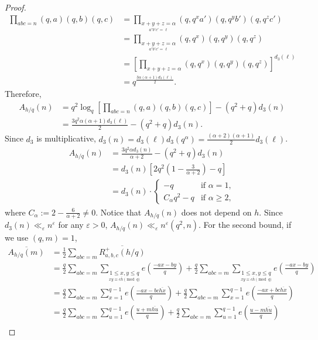 \documentclass[oneside,reqno,10pt]{amsart}
\numberwithin{equation}{section}
\theoremstyle{plain}
\theoremstyle{definition}
\numberwithin{equation}{section}
\begin{document}
\begin{proof}
\begin{align*}
        \prod_{abc=n} (q,a)(q,b)(q,c)&=\prod_{\underset{a'b'c'=\ell}{x+y+z=\alpha}}(q,q^xa')(q,q^yb')(q,q^zc')\\
        &=\prod_{\underset{a'b'c'=\ell}{x+y+z=\alpha}}(q,q^x)(q,q^y)(q,q^z)\\
        &=\left[\prod_{x+y+z=\alpha}(q,q^x)(q,q^y)(q,q^z)\right]^{d_3(\ell)}\\
        &=q^{\frac{3\alpha(\alpha+1)d_3(\ell)}{2}}.
\end{align*} 
Therefore, 
\begin{align*}
        A_{h/q}(n)&=q^2\log_q\left[\prod_{abc=n} (q,a)(q,b)(q,c)\right]-(q^2+q)d_3(n)\\
        &=\frac{3q^2\alpha(\alpha+1)d_3(\ell)}{2}-(q^2+q)d_3(n).
\end{align*} Since $d_3$ is multiplicative, $d_3(n)=d_3(\ell)d_3(q^\alpha)=\frac{(\alpha+2)(\alpha+1)}{2}d_3(\ell)$. 
\begin{align*}
        A_{h/q}(n)&=\frac{3q^2\alpha d_3(n)}{\alpha+2}-(q^2+q)d_3(n)\\
        &=d_3(n)\left[2q^2\left(1-\frac{3}{\alpha+2}\right)-q\right]\\
        &=d_3(n)\cdot \begin{cases}
          -q&\text{if }\alpha=1,\\
          C_{\alpha}q^2 -q&\text{if }\alpha\geq 2,
        \end{cases}
\end{align*} 
where $C_{\alpha}:=2-\frac{6}{\alpha+2}\neq 0$. Notice that $A_{h/q}(n)$ does not depend on $h$. Since $d_3(n)\ll_{\varepsilon} n^{\varepsilon}$ for any $\varepsilon>0$, $A_{h/q}(n)\ll_{\varepsilon}n^{\varepsilon}(q^2,n).$ For the second bound, if we use $(q,m)=1$,
\begin{align*}
        \overline{A_{h/q}(m)}&=\frac{1}{2}\sum_{abc=m}\overline{R^+_{a,b,c}(h/q)}\\
        &=\frac{q}{2}\sum_{abc=m}\sum_{\underset{xy\equiv c\bar h\pmod{q}}{1\leq x,y\leq q}}e\left(\frac{-ax-by}{q}\right)+\frac{q}{2}\sum_{abc=m}\sum_{\underset{xy\equiv c\bar h\pmod{q}}{1\leq x,y\leq q}}e\left(\frac{-ax-by}{q}\right)\\
        &=\frac{q}{2}\sum_{abc=m}\sum_{x=1}^{q-1}e\left(\frac{-ax-bc\overline{hx}}{q}\right)+\frac{q}{2}\sum_{abc=m}\sum_{x=1}^{q-1}e\left(\frac{-ax+bc\overline{hx}}{q}\right)\\
        &=\frac{q}{2}\sum_{abc=m}\sum_{u=1}^{q-1}e\left(\frac{u+m\overline{hu}}{q}\right)+\frac{q}{2}\sum_{abc=m}\sum_{u=1}^{q-1}e\left(\frac{u-m\overline{hu}}{q}\right)\\

\end{align*}
\end{proof}
\end{document}
